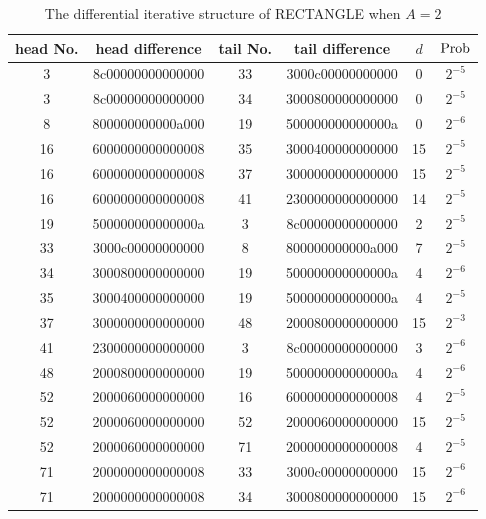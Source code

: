 \begin{table}
	\caption{The differential iterative structure of RECTANGLE when $A=2$}\label{tab:dis-rect}
	\centering
	\begin{tabular}{|c|c|c|c|c|c|}
		\hline
		head No. & head difference & tail No. & tail difference & $d$ & $\text{Prob}$ \\
		\hline
		3 & 8c00000000000000 & 33 & 3000c00000000000 & 0 & $2^{-5}$ \\
        3 & 8c00000000000000 & 34 & 3000800000000000 & 0 & $2^{-5}$ \\
        8 & 800000000000a000 & 19 & 500000000000000a & 0 & $2^{-6}$ \\
        16 & 6000000000000008 & 35 & 3000400000000000 & 15 & $2^{-5}$ \\
        16 & 6000000000000008 & 37 & 3000000000000000 & 15 & $2^{-5}$ \\
        16 & 6000000000000008 & 41 & 2300000000000000 & 14 & $2^{-5}$ \\
        19 & 500000000000000a & 3 & 8c00000000000000 & 2 & $2^{-5}$ \\
        33 & 3000c00000000000 & 8 & 800000000000a000 & 7 & $2^{-5}$ \\
        34 & 3000800000000000 & 19 & 500000000000000a & 4 & $2^{-6}$ \\
        35 & 3000400000000000 & 19 & 500000000000000a & 4 & $2^{-5}$ \\
        37 & 3000000000000000 & 48 & 2000800000000000 & 15 & $2^{-3}$ \\
        41 & 2300000000000000 & 3 & 8c00000000000000 & 3 & $2^{-6}$ \\
        48 & 2000800000000000 & 19 & 500000000000000a & 4 & $2^{-6}$ \\
        52 & 2000060000000000 & 16 & 6000000000000008 & 4 & $2^{-5}$ \\
        52 & 2000060000000000 & 52 & 2000060000000000 & 15 & $2^{-5}$ \\
        52 & 2000060000000000 & 71 & 2000000000000008 & 4 & $2^{-5}$ \\
        71 & 2000000000000008 & 33 & 3000c00000000000 & 15 & $2^{-6}$ \\
        71 & 2000000000000008 & 34 & 3000800000000000 & 15 & $2^{-6}$ \\
		\hline
	\end{tabular}
\end{table}